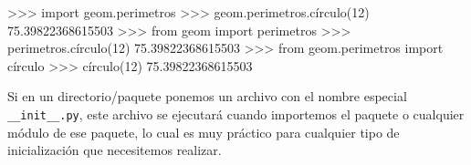 \begin{py}  
>>> import geom.perimetros
>>> geom.perimetros.círculo(12)
75.39822368615503
>>> from geom import perimetros
>>> perimetros.círculo(12)
75.39822368615503
>>> from geom.perimetros import círculo
>>> círculo(12)
75.39822368615503
\end{py}

Si en un directorio/paquete ponemos un archivo con el nombre especial \texttt{\_\_init\_\_.py}, este archivo se ejecutará cuando importemos el paquete o cualquier módulo de ese paquete, lo cual es muy práctico para cualquier tipo de inicialización que necesitemos realizar.
